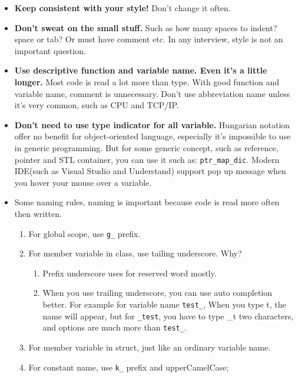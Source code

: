 \documentclass[a4paper,11pt,twoside]{book}
\begin{document}
\begin{itemize}
	\item \textbf{Keep consistent with your style!} Don't change it often.
	
	\item \textbf{Don't sweat on the small stuff.} Such as how many spaces to indent? space or tab? Or must have comment etc. In any interview, style is not an important question. 
	
	\item \textbf{Use descriptive function and variable name. Even it's a little longer.} Most code is read a lot more than type. With good function and variable name, comment is unnecessary. Don't use abbreviation name unless it's very common, such as CPU and TCP/IP.
	
	\item \textbf{Don't need to use type indicator for all variable.} Hungarian notation offer no benefit for object-oriented language, especially it's impossible to use in generic programming. But for some generic concept, such as reference, pointer and STL container, you can use it such as: \texttt{ptr\_map\_dic}. Modern IDE(such as Visual Studio and Understand) support pop up message when you hover your mouse over a variable.



	\item Some naming rules, naming is important because code is read more often then written.
\begin{enumerate}
	
	\item For global scope, use \texttt{g\_} prefix.
	
	\item For member variable in class, use tailing underscore. Why? 
	\begin{enumerate}
		\item Prefix underscore uses for reserved word mostly.
		\item When you use trailing underscore, you can use auto completion better. For example for variable name \texttt{test\_}, When you type t, the name will appear, but for \texttt{\_test}, you have to type \_t two characters, and options are much more than \texttt{test\_}.
	\end{enumerate}
	
	\item For member variable in struct, just like an ordinary variable name. 
	
	\item For constant name, use \texttt{k\_} prefix and upperCamelCase;
	

\end{enumerate}
\end{itemize}
\end{document}
